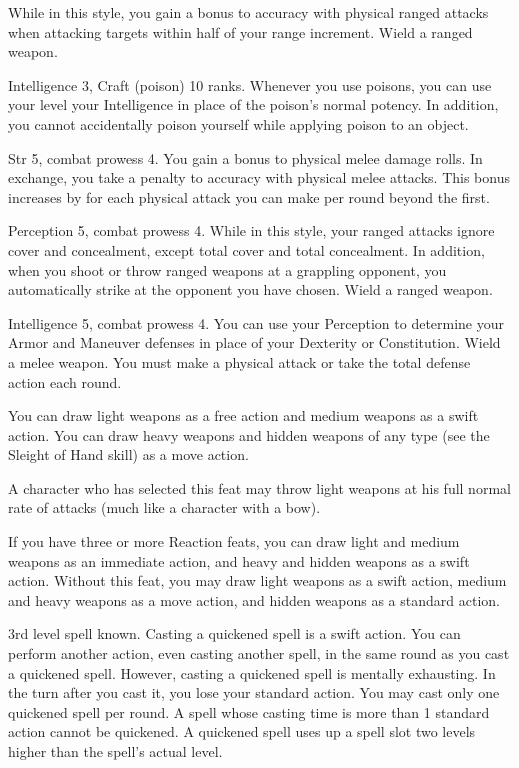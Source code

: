 \featben While in this style, you gain a  bonus to accuracy with physical ranged attacks when attacking targets within half of your range increment.
\stylereq Wield a ranged weapon.

\featpres Intelligence 3, Craft (poison) 10 ranks.
\featben Whenever you use poisons, you can use your level \add your Intelligence in place of the poison's normal potency.
In addition, you cannot accidentally poison yourself while applying poison to an object.

\featpres Str 5, combat prowess 4.
\featben You gain a  bonus to physical melee damage rolls.
In exchange, you take a  penalty to accuracy with physical melee attacks.
This bonus increases by  for each physical attack you can make per round beyond the first.

\featpres Perception 5, combat prowess 4.
\featben While in this style, your ranged attacks ignore cover and concealment, except total cover and total concealment.
In addition, when you shoot or throw ranged weapons at a grappling opponent, you automatically strike at the opponent you have chosen.
\stylereq Wield a ranged weapon.

\featpres Intelligence 5, combat prowess 4.
\featben You can use your Perception to determine your Armor and Maneuver defenses in place of your Dexterity or Constitution.
\stylereq Wield a melee weapon.
You must make a physical attack or take the total defense action each round.

\featben You can draw light weapons as a free action and medium weapons as a swift action.
You can draw heavy weapons and hidden weapons of any type (see the Sleight of Hand skill) as a move action.
\par A character who has selected this feat may throw light weapons at his full normal rate of attacks (much like a character with a bow).

If you have three or more Reaction feats, you can draw light and medium weapons as an immediate action, and heavy and hidden weapons as a swift action.
Without this feat, you may draw light weapons as a swift action, medium and heavy weapons as a move action, and hidden weapons as a standard action.

\label{Quicken Spell}
\featpre 3rd level spell known.
\featben Casting a quickened spell is a swift action.
You can perform another action, even casting another spell, in the same round as you cast a quickened spell.
However, casting a quickened spell is mentally exhausting.
In the turn after you cast it, you lose your standard action.
You may cast only one quickened spell per round.
A spell whose casting time is more than 1 standard action cannot be quickened.
A quickened spell uses up a spell slot two levels higher than the spell's actual level.

